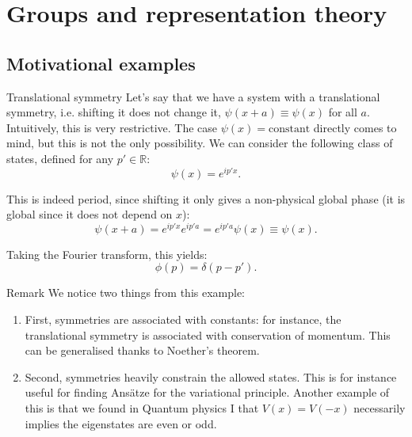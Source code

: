 \documentclass[a4paper]{article}
\begin{document}
\section{Groups and representation theory}
\subsection{Motivational examples}

\begin{parag}{Translational symmetry}
    Let's say that we have a system with a translational symmetry, i.e. shifting it does not change it, $\psi\left(x + a\right) \equiv \psi\left(x\right)$ for all $a$. Intuitively, this is very restrictive. The case $\psi\left(x\right) = \text{constant}$ directly comes to mind, but this is not the only possibility. We can consider the following class of states, defined for any $p' \in \mathbb{R}$:
    \[\psi\left(x\right) = e^{i p' x}.\]

    This is indeed period, since shifting it only gives a non-physical global phase (it is global since it does not depend on $x$): 
    \[\psi\left(x + a\right) = e^{i p' x} e^{i p' a} = e^{i p' a} \psi\left(x\right) \equiv \psi\left(x\right).\]
    
    Taking the Fourier transform, this yields: 
    \[\phi\left(p\right) = \delta\left(p - p'\right).\]

    \begin{subparag}{Remark}
        We notice two things from this example:
        \begin{enumerate}[left=0pt]
            \item First, symmetries are associated with constants: for instance, the translational symmetry is associated with conservation of momentum. This can be generalised thanks to Noether's theorem.
            \item Second, symmetries heavily constrain the allowed states. This is for instance useful for finding Ansätze for the variational principle. Another example of this is that we found in Quantum physics I that $V\left(x\right) = V\left(-x\right)$ necessarily implies the eigenstates are even or odd.
        \end{enumerate}
    \end{subparag}
\end{parag}
\end{document}
